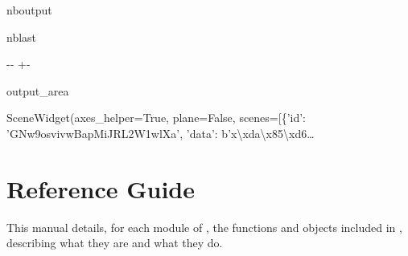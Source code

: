 \documentclass[letterpaper,10pt,english]{sphinxmanual}
\begin{document}
\begin{sphinxuseclass}{nboutput}
\begin{sphinxuseclass}{nblast}
{

\kern-\sphinxverbatimsmallskipamount\kern-\baselineskip
\kern+\FrameHeightAdjust\kern-\fboxrule
\vspace{\nbsphinxcodecellspacing}

\begin{sphinxuseclass}{output_area}
\begin{sphinxuseclass}{}


\begin{sphinxVerbatim}[commandchars=\\\{\}]
\llap{\color{nbsphinxout}[33]:\,\hspace{\fboxrule}\hspace{\fboxsep}}SceneWidget(axes\_helper=True, plane=False, scenes=[\{'id': 'GNw9osvivwBapMiJRL2W1wlXa', 'data': b'x\textbackslash{}xda\textbackslash{}x85\textbackslash{}xd6…
\end{sphinxVerbatim}



\end{sphinxuseclass}
\end{sphinxuseclass}
}

\end{sphinxuseclass}
\end{sphinxuseclass}
\sphinxstepscope


\section{Reference Guide}
\label{\detokenize{reference:reference-guide}}\label{\detokenize{reference:lightvegemanager-reference}}\label{\detokenize{reference::doc}}
\sphinxAtStartPar
This manual details, for each module of {\hyperref[\detokenize{index:module-lightvegemanager}]{}}, the functions and objects included in {\hyperref[\detokenize{index:module-lightvegemanager}]{}},
describing what they are and what they do.
\end{document}
